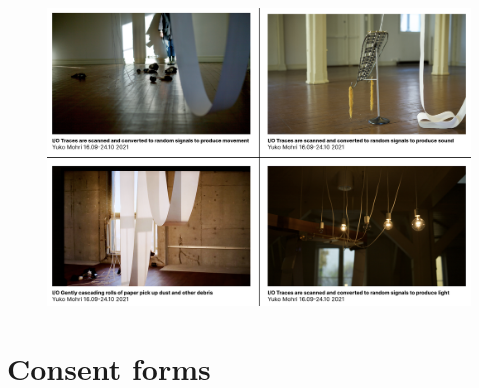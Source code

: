 \begin{figure}[H]
\includegraphics[width=13cm]{pictures/dataset/yuko_mohri.png}
\centering 
\end{figure}





\section{Consent forms}

